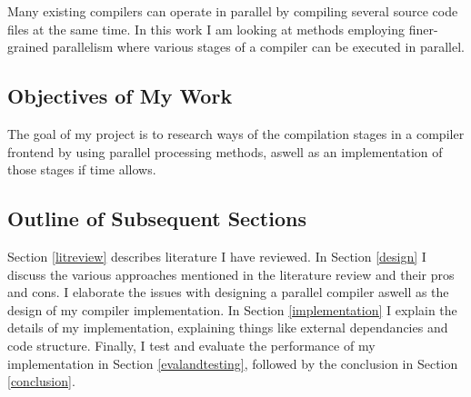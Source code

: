 Many existing compilers can operate in parallel by compiling several source
code files at the same time. In this work I am looking at methods employing
finer-grained parallelism where various stages of a compiler can be executed
in parallel.

\subsection{Objectives of My Work}

The goal of my project is to research ways of the compilation stages in
a compiler frontend by using parallel processing methods, aswell as an
implementation of those stages if time allows.

\subsection{Outline of Subsequent Sections}

Section \ref{litreview} describes literature I have reviewed. In Section
\ref{design} I discuss the various approaches mentioned in the literature
review and their pros and cons. I elaborate the issues with designing a
parallel compiler aswell as the design of my compiler implementation. In Section
\ref{implementation} I explain the details of my implementation, explaining
things like external dependancies and code structure. Finally, I test and
evaluate the performance of my implementation in Section \ref{evalandtesting},
followed by the conclusion in Section \ref{conclusion}.
